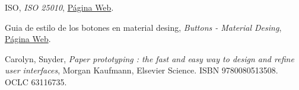 \documentclass[a4paper,11pt]{article}
\begin{document}
\begin{thebibliography}{99}
ISO,
\textit{ISO 25010},
\href{https://iso25000.com/index.php/normas-iso-25000/iso-25010/23-usabilidad}{Página Web}.

Guia de estilo de los botones en material desing,
\textit{Buttons - Material Desing},
\href{https://material.io/design/components/buttons.html}{Página Web}.


Carolyn, Snyder,
\textit{Paper prototyping : the fast and easy way to design and refine user interfaces},
 Morgan Kaufmann, Elsevier Science. ISBN 9780080513508. OCLC 63116735.




\end{thebibliography}
\end{document}
